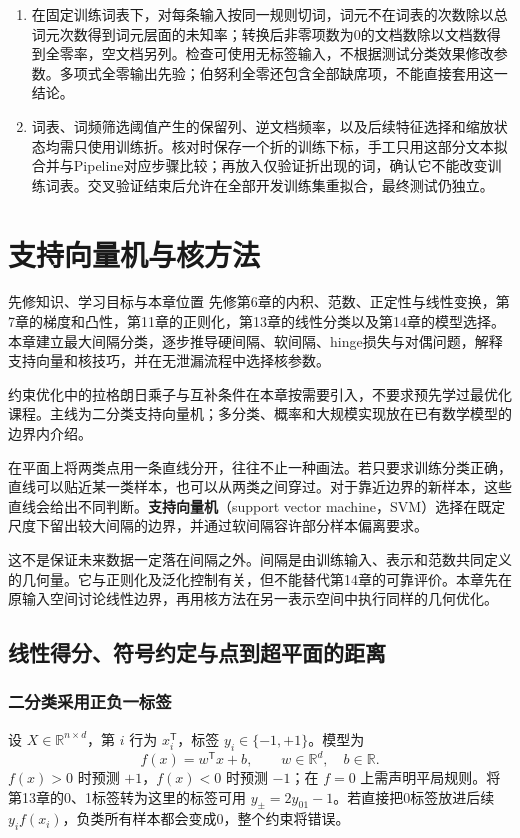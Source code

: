 \documentclass[UTF8,fontset=none,zihao=-4,a4paper]{ctexart}
\newcommand{\chapterpage}[1]{\clearpage\section{#1}}
\newcommand{\term}[1]{\textbf{#1}}
\numberwithin{equation}{section}
\numberwithin{figure}{section}
\begin{document}
\begin{enumerate}[label=16.\arabic*]
\item 在固定训练词表下，对每条输入按同一规则切词，词元不在词表的次数除以总词元次数得到词元层面的未知率；转换后非零项数为0的文档数除以文档数得到全零率，空文档另列。检查可使用无标签输入，不根据测试分类效果修改参数。多项式全零输出先验；伯努利全零还包含全部缺席项，不能直接套用这一结论。
\item 词表、词频筛选阈值产生的保留列、逆文档频率，以及后续特征选择和缩放状态均需只使用训练折。核对时保存一个折的训练下标，手工只用这部分文本拟合并与Pipeline对应步骤比较；再放入仅验证折出现的词，确认它不能改变训练词表。交叉验证结束后允许在全部开发训练集重拟合，最终测试仍独立。
\end{enumerate}

\chapterpage{支持向量机与核方法}\label{ch:svm}
\begin{infobox}{先修知识、学习目标与本章位置}
先修第6章的内积、范数、正定性与线性变换，第7章的梯度和凸性，第11章的正则化，第13章的线性分类以及第14章的模型选择。本章建立最大间隔分类，逐步推导硬间隔、软间隔、hinge损失与对偶问题，解释支持向量和核技巧，并在无泄漏流程中选择核参数。

约束优化中的拉格朗日乘子与互补条件在本章按需要引入，不要求预先学过最优化课程。主线为二分类支持向量机；多分类、概率和大规模实现放在已有数学模型的边界内介绍。
\end{infobox}
在平面上将两类点用一条直线分开，往往不止一种画法。若只要求训练分类正确，直线可以贴近某一类样本，也可以从两类之间穿过。对于靠近边界的新样本，这些直线会给出不同判断。\term{支持向量机}（support vector machine，SVM）选择在既定尺度下留出较大间隔的边界，并通过软间隔容许部分样本偏离要求。

这不是保证未来数据一定落在间隔之外。间隔是由训练输入、表示和范数共同定义的几何量。它与正则化及泛化控制有关，但不能替代第14章的可靠评价。本章先在原输入空间讨论线性边界，再用核方法在另一表示空间中执行同样的几何优化。

\subsection{线性得分、符号约定与点到超平面的距离}
\subsubsection{二分类采用正负一标签}
设 $X\in\mathbb R^{n\times d}$，第 $i$ 行为 $x_i^{\mathsf T}$，标签 $y_i\in\{-1,+1\}$。模型为
\[
 f(x)=w^{\mathsf T}x+b,\qquad w\in\mathbb R^d,\quad b\in\mathbb R.
\]
$f(x)>0$ 时预测 $+1$，$f(x)<0$ 时预测 $-1$；在 $f=0$ 上需声明平局规则。将第13章的0、1标签转为这里的标签可用 $y_{\pm}=2y_{01}-1$。若直接把0标签放进后续 $y_if(x_i)$，负类所有样本都会变成0，整个约束将错误。
\end{document}
